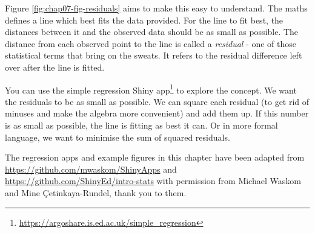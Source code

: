 \documentclass[
  12pt,
  krantz2]{krantz}
\renewcommand{\href}[2]{#2\footnote{\url{#1}}}
\begin{document}
Figure \ref{fig:chap07-fig-residuals} aims to make this easy to understand.
The maths defines a line which best fits the data provided.
For the line to fit best, the distances between it and the observed data should be as small as possible.
The distance from each observed point to the line is called a \emph{residual} - one of those statistical terms that bring on the sweats.
It refers to the residual difference left over after the line is fitted.

You can use the \href{https://argoshare.is.ed.ac.uk/simple_regression}{simple regression Shiny app} to explore the concept.
We want the residuals to be as small as possible.
We can square each residual (to get rid of minuses and make the algebra more convenient) and add them up.
If this number is as small as possible, the line is fitting as best it can.
Or in more formal language, we want to minimise the sum of squared residuals.

The regression apps and example figures in this chapter have been adapted from \url{https://github.com/mwaskom/ShinyApps} and \url{https://github.com/ShinyEd/intro-stats} with permission from Michael Waskom and Mine Çetinkaya-Rundel, thank you to them.
\end{document}
